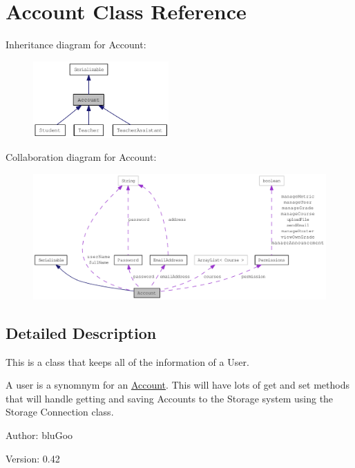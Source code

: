 \hypertarget{classAccount}{
\section{Account Class Reference}
\label{classAccount}
}
Inheritance diagram for Account:\nopagebreak
\begin{figure}[H]
\begin{center}
\leavevmode
\includegraphics[width=147pt]{classAccount__inherit__graph}
\end{center}
\end{figure}
Collaboration diagram for Account:\nopagebreak
\begin{figure}[H]
\begin{center}
\leavevmode
\includegraphics[width=400pt]{classAccount__coll__graph}
\end{center}
\end{figure}


\subsection{Detailed Description}
This is a class that keeps all of the information of a User. 

A user is a synomnym for an \hyperlink{classAccount}{Account}. This will have lots of get and set methods that will handle getting and saving Accounts to the Storage system using the Storage Connection class. \begin{Desc}
\item[Author:]bluGoo \end{Desc}
\begin{Desc}
\item[Version:]0.42 \end{Desc}


